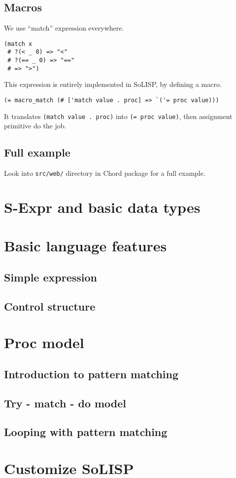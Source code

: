 \documentclass[a4paper,11pt]{article}
\begin{document}
\subsection{Macros}

We use ``match'' expression everywhere.

\begin{verbatim}
(match x
 # ?(< _ 0) => "<"
 # ?(== _ 0) => "=="
 # => ">")
\end{verbatim}

This expression is entirely implemented in SoLISP, by defining a macro.

\begin{verbatim}
(= macro_match (# ['match value . proc] => `('= proc value)))
\end{verbatim}

It translates \verb|(match value . proc)| into \verb|(= proc value)|, then assignment primitive do the job.

\subsection{Full example}

Look into \verb|src/web/| directory in Chord package for a full example.

\section{S-Expr and basic data types}

\section{Basic language features}

\subsection{Simple expression}

\subsection{Control structure}

\section{Proc model}

\subsection{Introduction to pattern matching}

\subsection{Try - match - do model}

\subsection{Looping with pattern matching}

\section{Customize SoLISP}
\end{document}

